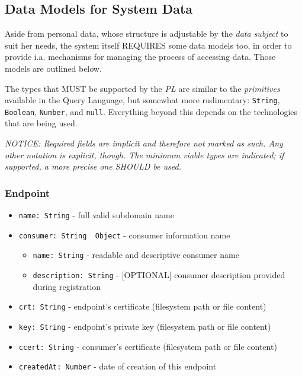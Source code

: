 \documentclass[12pt,english,a4paper,titlepage,cleardoublepage=empty,dottedtoc]{report}
\providecommand{\tightlist}{%
  \setlength{\itemsep}{0pt}\setlength{\parskip}{0pt}}
\begin{document}
\subsection{Data Models for System
Data}\label{data-models-for-system-data}

Aside from personal data, whose structure is adjustable by the
\emph{data subject} to suit her needs, the system itself REQUIRES some
data models too, in order to provide i.a. mechanisms for managing the
process of accessing data. Those models are outlined below.

The types that MUST be supported by the \emph{PL} are similar to the
\emph{primitives} available in the Query Language, but somewhat more
rudimentary: \texttt{String}, \texttt{Boolean}, \texttt{Number}, and
\texttt{null}. Everything beyond this depends on the technologies that
are being used.

\emph{NOTICE: Required fields are implicit and therefore not marked as
such. Any other notation is explicit, though. The minimum viable types
are indicated; if supported, a more precise one SHOULD be used.}

\subsubsection{Endpoint}\label{endpoint}

\begin{itemize}
\tightlist
\item
  \texttt{name:\ String} - full valid subdomain name
\item
  \texttt{consumer:\ String\ \textbar{}\textbar{}\ Object} - consumer
  information \textbar{}\textbar{} name

  \begin{itemize}
  \tightlist
  \item
    \texttt{name:\ String} - readable and descriptive consumer name
  \item
    \texttt{description:\ String} - {[}OPTIONAL{]} consumer description
    provided during registration
  \end{itemize}
\item
  \texttt{crt:\ String} - endpoint's certificate (filesystem path or
  file content)
\item
  \texttt{key:\ String} - endpoint's private key (filesystem path or
  file content)
\item
  \texttt{ccert:\ String} - consumer's certificate (filesystem path or
  file content)
\item
  \texttt{createdAt:\ Number} - date of creation of this endpoint
\end{itemize}
\end{document}
